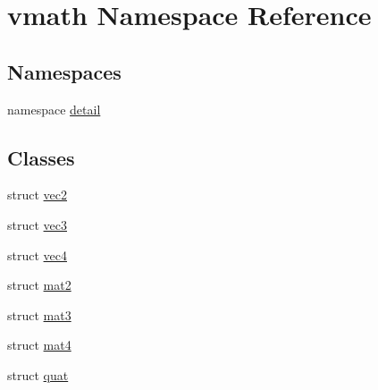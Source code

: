 \hypertarget{namespacevmath}{\section{vmath Namespace Reference}
\label{namespacevmath}
}
\subsection*{Namespaces}
\begin{DoxyCompactItemize}
\item 
namespace \hyperlink{namespacevmath_1_1detail}{detail}
\end{DoxyCompactItemize}
\subsection*{Classes}
\begin{DoxyCompactItemize}
\item 
struct \hyperlink{structvmath_1_1vec2}{vec2}
\item 
struct \hyperlink{structvmath_1_1vec3}{vec3}
\item 
struct \hyperlink{structvmath_1_1vec4}{vec4}
\item 
struct \hyperlink{structvmath_1_1mat2}{mat2}
\item 
struct \hyperlink{structvmath_1_1mat3}{mat3}
\item 
struct \hyperlink{structvmath_1_1mat4}{mat4}
\item 
struct \hyperlink{structvmath_1_1quat}{quat}
\end{DoxyCompactItemize}
